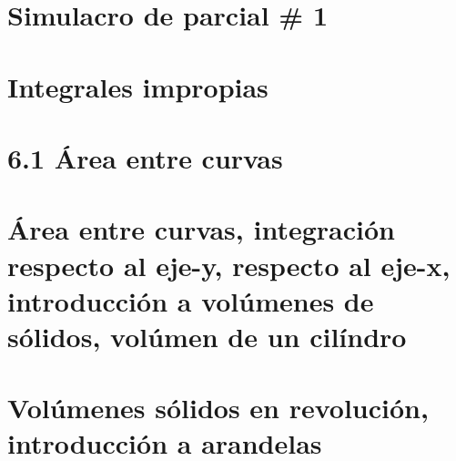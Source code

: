 \documentclass{book}
\begin{document}
% 

\chapter{Simulacro de parcial \# 1} 


\chapter{Integrales impropias} 


\chapter{6.1 Área entre curvas} 


\chapter{Área entre curvas, integración respecto al eje-y, respecto al eje-x, introducción a volúmenes de sólidos, volúmen de un cilíndro} 


\chapter{Volúmenes sólidos en revolución, introducción a arandelas} 

\end{document}
